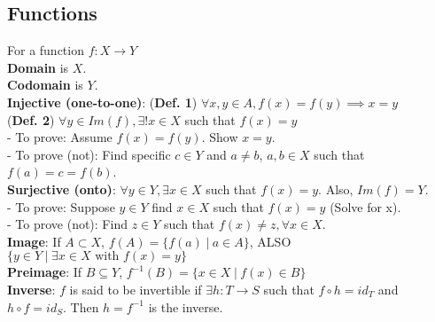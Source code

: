 \documentclass{article}
\newcommand\setbar{\hspace{3pt} \big| \hspace{3pt}}
\begin{document}
\begin{multicols}{3}
\subsection*{Functions}
  For a function $f: X \to Y$\\
  \textbf{Domain} is $X$.\\
  \textbf{Codomain} is $Y$.\\
  \textbf{Injective (one-to-one)}: (\textbf{Def. 1}) $\forall x,y \in A, f(x) = f(y) \implies x = y$\\ (\textbf{Def. 2}) $\forall y \in Im(f), \exists ! x \in X$ such that $f(x) = y$\\
  - To prove: Assume $f(x) = f(y)$. Show $x = y$.\\
  - To prove (not): Find specific $c \in Y$ and $a \not = b$, $a,b\in X$ such that $f(a) = c = f(b)$.\\
  \textbf{Surjective (onto)}: $\forall y \in Y, \exists x \in X$ such that $f(x) = y$. Also, $Im(f) = Y$.\\
  - To prove: Suppose $y \in Y$ find $x \in X$ such that $f(x) = y$ (Solve for x).\\ 
  - To prove (not): Find $z \in Y$ such that $f(x) \not = z, \forall x \in X$.\\
  \textbf{Image}: If $A \subset X$, $f(A) = \{f(a)\setbar a \in A\}$, 
  ALSO $\{y \in Y\setbar \exists x \in X \text{ with } f(x) = y\}$\\
  \textbf{Preimage}: If $B \subseteq Y$, $f^{-1}(B) = \{x \in X \setbar f(x) \in B \}$\\
  \textbf{Inverse}: $f$ is said to be invertible if $\exists h:T \to S$ such that
  $f \circ h = id_T$ and $h \circ f = id_S$. Then $h = f^{-1}$ is the inverse.

\end{multicols}
\end{document}
